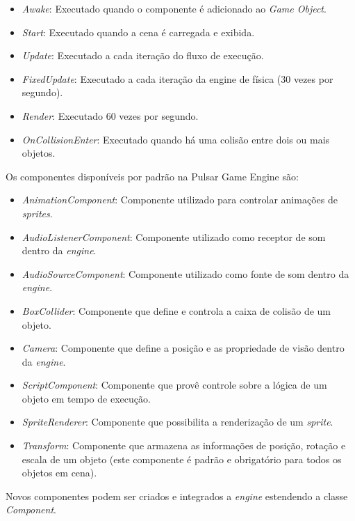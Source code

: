 \documentclass[12pt,	openright, twoside,	a4paper, english, french, spanish, brazil]{abntex2}
\begin{document}
\begin{itemize}
\item \textit{Awake}: Executado quando o componente é adicionado ao \textit{Game Object}.
\item \textit{Start}: Executado quando a cena é carregada e exibida.
\item \textit{Update}: Executado a cada iteração do fluxo de execução.
\item \textit{FixedUpdate}: Executado a cada iteração da engine de física (30 vezes por segundo).
\item \textit{Render}: Executado 60 vezes por segundo.
\item \textit{OnCollisionEnter}: Executado quando há uma colisão entre dois ou mais objetos.
\end{itemize}

Os componentes disponíveis por padrão na Pulsar Game Engine são:

\begin{itemize}
\item \textit{AnimationComponent}: Componente utilizado para controlar animações de \textit{sprites}. 
\item \textit{AudioListenerComponent}: Componente utilizado como receptor de som dentro da \textit{engine}.
\item \textit{AudioSourceComponent}: Componente utilizado como fonte de som dentro da \textit{engine}.
\item \textit{BoxCollider}: Componente que define e controla a caixa de colisão de um objeto.
\item \textit{Camera}: Componente que define a posição e as propriedade de visão dentro da \textit{engine}.
\item \textit{ScriptComponent}: Componente que provê controle sobre a lógica de um objeto em tempo de execução.
\item \textit{SpriteRenderer}: Componente que possibilita a renderização de um \textit{sprite}.
\item \textit{Transform}: Componente que armazena as informações de posição, rotação e escala de um objeto (este componente é padrão e obrigatório para todos os objetos em cena).
\end{itemize}

Novos componentes podem ser criados e integrados a \textit{engine} estendendo a classe \textit{Component}.

%
%
\end{document}
